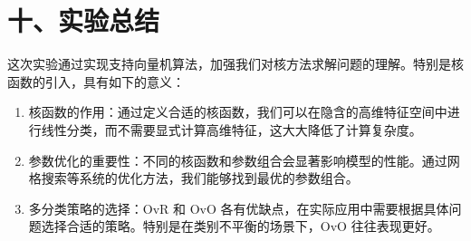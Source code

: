 \documentclass[12pt,a4paper]{ctexart}
\begin{document}
	\section*{十、实验总结}
	这次实验通过实现支持向量机算法，加强我们对核方法求解问题的理解。特别是核函数的引入，具有如下的意义：
	\begin{enumerate}
		\item 核函数的作用：通过定义合适的核函数，我们可以在隐含的高维特征空间中进行线性分类，而不需要显式计算高维特征，这大大降低了计算复杂度。
		\item 参数优化的重要性：不同的核函数和参数组合会显著影响模型的性能。通过网格搜索等系统的优化方法，我们能够找到最优的参数组合。
		\item 多分类策略的选择：OvR 和 OvO 各有优缺点，在实际应用中需要根据具体问题选择合适的策略。特别是在类别不平衡的场景下，OvO 往往表现更好。
	\end{enumerate}
\end{document}
